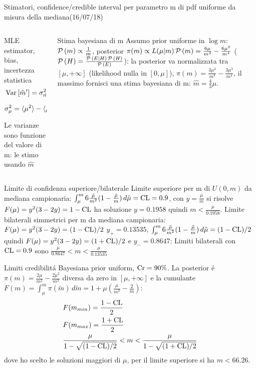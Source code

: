 \begin{frame}{Stimatori, confidence/credible interval per parametro m di pdf uniforme da misura della mediana(16/07/18)}
\begin{columns}[T]\begin{column}{0.5\textwidth}
\begin{block}{MLE estimator, bias, incertezza statistica}
\begin{align*}
&\operatorname{Var}{[\hat{m}']}=\sigma^2_{\hat{m}'}=4\operatorname{Var}{\mu}=4\sigma_{\mu}^2\\
&\sigma^2_{\mu}=\langle \mu^2 \rangle-\langle \mu \rangle^2=\frac{m^2}{20}
\end{align*}
Le varianze sono funzione del valore di m: le stimo usando $\hat{m}$
\end{block}
\end{column}\begin{column}{0.5\textwidth}
\begin{block}{Stima bayesiana di m}
Assumo prior uniforme in $\log{m}$: $\operatorname{\mathcal{P}}{(m)}\propto\frac{1}{m}$, posterior $\pi(m)\propto L(\mu|m)\operatorname{\mathcal{P}}{(m)}=\frac{6\mu}{m^3}-\frac{6\mu^2}{m^4}$ ($\operatorname{\mathcal{P}}{(H)}=\frac{\operatorname{\mathcal{P}}{(E|H)\operatorname{\mathcal{P}}{(H)}}}{\operatorname{\mathcal{P}}{(E)}}$): la posterior va normalizzata tra $[\mu,+\infty]$ (likelihood nulla  in $[0,\mu]$), $\pi(m)=\frac{3\mu^2}{m^3}-\frac{3\mu^3}{m^4}$, il massimo fornisci una stima bayesiana di m: $\hat{m}=\frac{4}{3}\mu$.
\end{block}
\end{column}\end{columns}
\end{frame}

\begin{frame}{Limite di confidenza superiore/bilaterale}
Limite superiore per m di $U(0,m)$ da mediana campionaria: $\int_{\mu}^m6\frac{\tilde{\mu}}{m^2}(1-\frac{\tilde{\mu}}{m})\,d\tilde{\mu}=\operatorname{CL}=0.9$, con $y=\frac{\mu}{m}$ si risolve $F(\mu)=y^2(3-2y)=1-\operatorname{CL}$ ha soluzione $y=0.1958$ quindi $m<\frac{\mu}{0.1958}$.
Limite bilaterali simmetrici per m da mediana campionaria: $F(\mu)=y^2(3-2y)=(1-\operatorname{CL})/2$ $y_+=0.13535$, $\int_{\mu}^m6\frac{\tilde{\mu}}{m^2}(1-\frac{\tilde{\mu}}{m})\,d\tilde{\mu}=(1-\operatorname{CL})/2$ quindi $F(\mu)=y^2(3-2y)=(1+\operatorname{CL})/2$ e $y_-=0.8647$: Limiti bilaterali con $\operatorname{CL}=0.9$ sono $\frac{\mu}{0.8647}<m<\frac{\mu}{0.13535}$
\end{frame}

\begin{frame}{Limiti credibilit\'a Bayesiana}
prior uniform, $\operatorname{Cr}=90\%$. La posterior \'e $\pi(m)=\frac{2\mu}{m^2}-\frac{2\mu^2}{m^3}$ diversa da zero in $[\mu,+\infty]$ e la cumulante $F(m)=\int_{\mu}^m\pi(\tilde{m})\,d\tilde{m}=1+\mu(\frac{\mu}{m^2}-\frac{2}{m})$:
\begin{align*}
&F(m_{min})=\frac{1-\operatorname{CL}}{2}\\
&F(m_{max})=\frac{1+\operatorname{CL}}{2}\\
&\frac{\mu}{1-\sqrt{(1-\operatorname{CL})/2}}<m<\frac{\mu}{1-\sqrt{(1+\operatorname{CL})/2}}
\end{align*}
dove ho scelto le soluzioni maggiori di $\mu$, per il limite superiore si ha $m<66.26$.
\end{frame}

